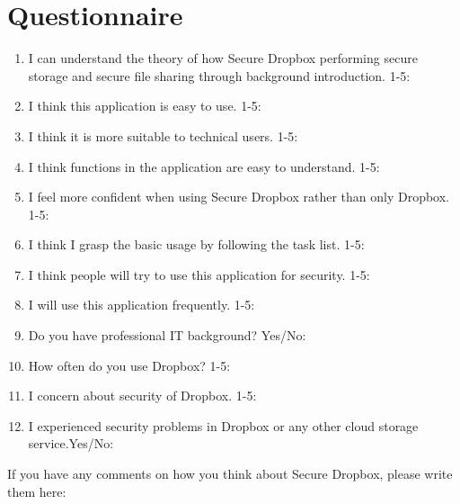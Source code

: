 \chapter{Questionnaire}
\begin{enumerate}
  \item
  I can understand the theory of how Secure Dropbox performing secure storage and secure file sharing through background introduction. 1-5:
  \item
  I think this application is easy to use. 1-5:
  \item
  I think it is more suitable to technical users. 1-5:
  \item
  I think functions in the application are easy to understand. 1-5:
  \item
  I feel more confident when using Secure Dropbox rather than only Dropbox. 1-5:
  \item
  I think I grasp the basic usage by following the task list. 1-5:
  \item
  I think people will try to use this application for security. 1-5:
  \item
  I will use this application frequently. 1-5:
  \item
  Do you have professional IT background? Yes/No: 
  \item
  How often do you use Dropbox? 1-5:
  \item
  I concern about security of Dropbox. 1-5:
  \item
  I experienced security problems in Dropbox or any other cloud storage service.Yes/No:
 \end{enumerate} 
 If you have any comments on how you think about Secure Dropbox, please write them here: